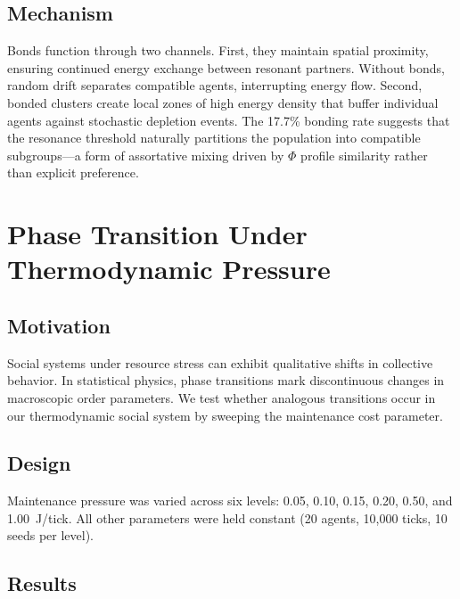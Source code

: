 \documentclass[12pt,a4paper]{article}
\begin{document}
\subsection{Mechanism}

Bonds function through two channels. First, they maintain spatial proximity, ensuring continued energy exchange between resonant partners. Without bonds, random drift separates compatible agents, interrupting energy flow. Second, bonded clusters create local zones of high energy density that buffer individual agents against stochastic depletion events. The 17.7\% bonding rate suggests that the resonance threshold naturally partitions the population into compatible subgroups---a form of assortative mixing driven by $\Phi$ profile similarity rather than explicit preference.

\section{Phase Transition Under Thermodynamic Pressure}
\label{sec:phase}

\subsection{Motivation}

Social systems under resource stress can exhibit qualitative shifts in collective behavior. In statistical physics, phase transitions mark discontinuous changes in macroscopic order parameters. We test whether analogous transitions occur in our thermodynamic social system by sweeping the maintenance cost parameter.

\subsection{Design}

Maintenance pressure was varied across six levels: 0.05, 0.10, 0.15, 0.20, 0.50, and 1.00~J/tick. All other parameters were held constant (20 agents, 10{,}000 ticks, 10 seeds per level).

\subsection{Results}
\end{document}
